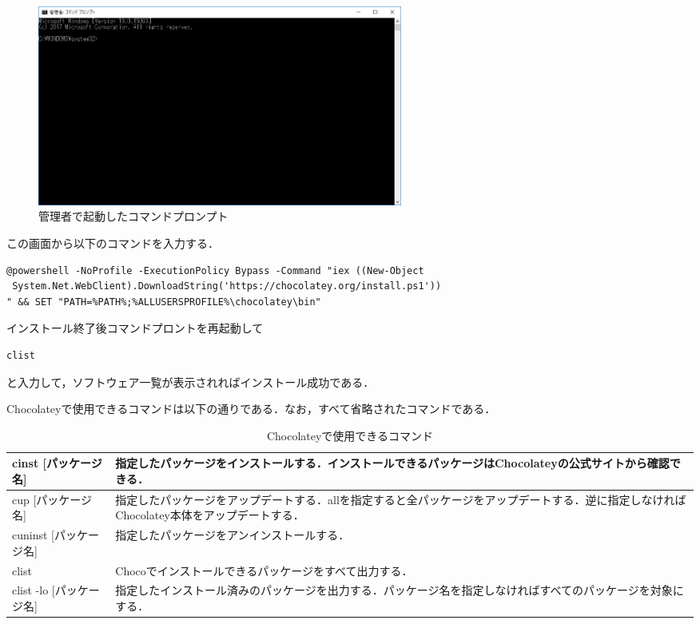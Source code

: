 \begin{figure}[h]
\centering
\includegraphics[width=12cm]{comand.PNG}
\caption{管理者で起動したコマンドプロンプト}\label{サンプル図}

\end{figure}


この画面から以下のコマンドを入力する．


\begin{verbatim}
@powershell -NoProfile -ExecutionPolicy Bypass -Command "iex ((New-Object
 System.Net.WebClient).DownloadString('https://chocolatey.org/install.ps1'))
" && SET "PATH=%PATH%;%ALLUSERSPROFILE%\chocolatey\bin"
\end{verbatim}

インストール終了後コマンドプロントを再起動して

\begin{verbatim}
clist
\end{verbatim}


と入力して，ソフトウェア一覧が表示されればインストール成功である．

\newpage





Chocolateyで使用できるコマンドは以下の通りである．なお，すべて省略されたコマンドである．


\begin{table}[htb]
   \caption{Chocolateyで使用できるコマンド}
  \begin{tabular}{|p{3cm}|p{9.5cm}|} \hline 
    cinst [パッケージ名] & 指定したパッケージをインストールする．インストールできるパッケージはChocolateyの公式サイトから確認できる． \\ \hline \hline
   cup [パッケージ名] & 指定したパッケージをアップデートする．allを指定すると全パッケージをアップデートする．逆に指定しなければChocolatey本体をアップデートする． \\ \hline
    cuninst [パッケージ名] & 指定したパッケージをアンインストールする．   \\ \hline
    clist & Chocoでインストールできるパッケージをすべて出力する． \\ \hline
    clist -lo [パッケージ名] & 指定したインストール済みのパッケージを出力する．パッケージ名を指定しなければすべてのパッケージを対象にする． \\ \hline
  \end{tabular}
\end{table}





